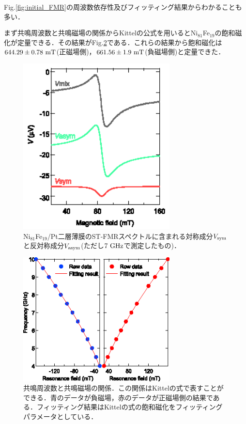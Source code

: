 Fig.\ref{fig:initial_FMR}の周波数依存性及びフィッティング結果からわかることも多い．

まず共鳴周波数と共鳴磁場の関係からKittelの公式を用いるとNi$_{81}$Fe$_{19}$の飽和磁化が定量できる．その結果がFig.\ref{fig:kittel_initial}である．これらの結果から飽和磁化は$644.29 \pm 0.78\rm\ mT$(正磁場側)，$661.56 \pm 1.9\rm\ mT$(負磁場側)と定量できた．



\begin{figure}[htbp]
\centerline{
\includegraphics[width=8cm]{images/Vseparate.eps}
}
\caption{Ni$_{81}$Fe$_{19}$/Pt二層薄膜のST-FMRスペクトルに含まれる対称成分$V_{\rm sym}$と反対称成分$V_{\rm asym}$(ただし$7\rm\ GHz$で測定したもの)．
}
\label{fig:Vseparate} 
\end{figure}


\begin{figure}[htbp]
\centerline{
\includegraphics[width=8cm]{images/kittel_initial.eps}
}
\caption{共鳴周波数と共鳴磁場の関係．この関係はKittelの式で表すことができる．青のデータが負磁場，赤のデータが正磁場側の結果である．フィッティング結果はKittelの式の飽和磁化をフィッティングパラメータとしている．
}
\label{fig:kittel_initial} 
\end{figure}


